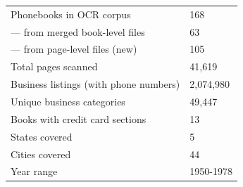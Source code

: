 \begin{tabular}[t]{ll}
\toprule
 & \\
\midrule
Phonebooks in OCR corpus & 168\\
--- from merged book-level files & 63\\
--- from page-level files (new) & 105\\
Total pages scanned & 41,619\\
Business listings (with phone numbers) & 2,074,980\\
\addlinespace
Unique business categories & 49,447\\
Books with credit card sections & 13\\
States covered & 5\\
Cities covered & 44\\
Year range & 1950-1978\\
\bottomrule
\end{tabular}
